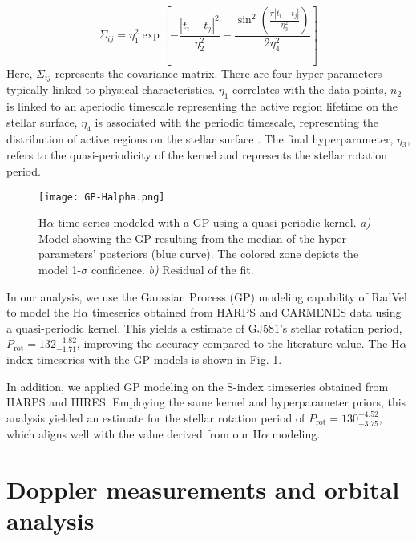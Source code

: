 \documentclass[baaa]{baaa}
\begin{document}
\begin{equation}
    \Sigma_{ij} = \eta_1^2 \exp \left[ -\frac{|t_i-t_j|^2}{\eta_2^2} - \frac{\sin^2{\left( \frac{\pi |t_i-t_j|}{\eta_3^2}\right)}}{2\eta_4^2}
    \right]
\end{equation}
Here, $\Sigma_{ij}$ represents the covariance matrix. There are four hyper-parameters typically linked to physical characteristics. $\eta_1$ correlates with the data points, $n_2$ is linked to an aperiodic timescale representing the active region lifetime on the stellar surface, $\eta_4$ is associated with the periodic timescale, representing the distribution of active regions on the stellar surface \citep{2023Camacho}. The final hyperparameter, $\eta_3$, refers to the quasi-periodicity of the kernel and represents the stellar rotation period.

\begin{figure}[t]
    \centering
    \texttt{[image: GP-Halpha.png]}
    \caption{H$\alpha$ time series modeled with a GP using a quasi-periodic kernel. \textit{a)} Model showing the GP resulting from the median of the hyper-parameters’ posteriors (blue curve). The colored zone depicts the model 1-$\sigma$ confidence. \textit{b)} Residual of the fit.}
    \label{fig:SRP}
\end{figure}

In our analysis, we use the Gaussian Process (GP) modeling capability of {\sc RadVel} \citep{2018RadVel} to model the H$\alpha$ timeseries obtained from HARPS and CARMENES data using a quasi-periodic kernel. This yields a estimate of GJ581's stellar rotation period, $P_{\mathrm{rot}}=132^{+1.82}_{-1.71}$, improving the accuracy compared to the literature value. The H$\alpha$ index timeseries with the GP models is shown in Fig. \ref{fig:SRP}.

In addition, we applied GP modeling on the S-index timeseries obtained from HARPS and HIRES. Employing the same kernel and hyperparameter priors, this analysis yielded an estimate for the stellar rotation period of $P_{\mathrm{rot}} = 130^{+4.52}_{-3.75}$, which aligns well with the value derived from our H$\alpha$ modeling.


\section{Doppler measurements and orbital analysis}\label{sec4}
\end{document}
